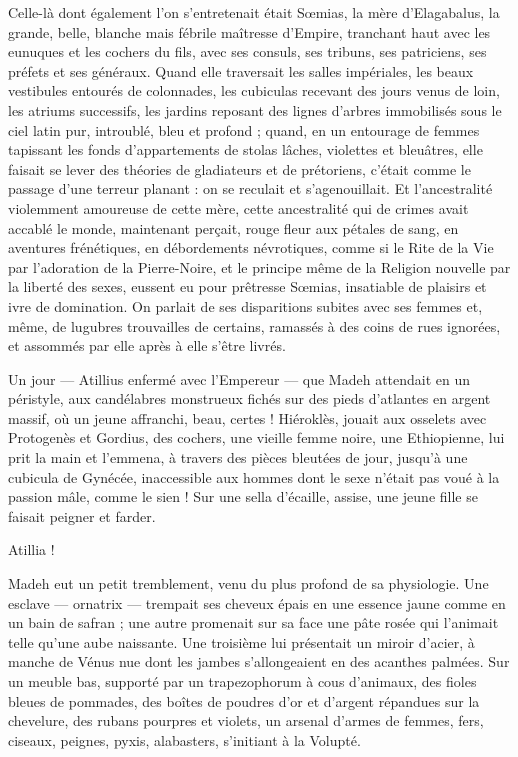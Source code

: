 \documentclass[a4paper, 11pt, oneside, polutonikogreek, french]{article}
\begin{document}
Celle-là dont également l'on s'entretenait était Sœmias, la mère d'Elagabalus, la grande, belle, blanche mais fébrile maîtresse d'Empire, tranchant haut avec les eunuques et les cochers du fils, avec ses consuls, ses tribuns, ses patriciens, ses préfets et ses généraux. Quand elle traversait les salles impériales, les beaux vestibules entourés de colonnades, les cubiculas recevant des jours venus de loin, les atriums successifs, les jardins reposant des lignes d'arbres immobilisés sous le ciel latin pur, introublé, bleu et profond ; quand, en un entourage de femmes tapissant les fonds d'appartements de stolas lâches, violettes et bleuâtres, elle faisait se lever des théories de gladiateurs et de prétoriens, c'était comme le passage d'une terreur planant : on se reculait et s'agenouillait. Et l'ancestralité violemment amoureuse de cette mère, cette ancestralité qui de crimes avait accablé le monde, maintenant perçait, rouge fleur aux pétales de sang, en aventures frénétiques, en débordements névrotiques, comme si le Rite de la Vie par l'adoration de la Pierre-Noire, et le principe même de la Religion nouvelle par la liberté des sexes, eussent eu pour prêtresse Sœmias, insatiable de plaisirs et ivre de domination. On parlait de ses disparitions subites avec ses femmes et, même, de lugubres trouvailles de certains, ramassés à des coins de rues ignorées, et assommés par elle après à elle s'être livrés.

Un jour --- Atillius enfermé avec l'Empereur --- que Madeh attendait en un péristyle, aux candélabres monstrueux fichés sur des pieds d'atlantes en argent massif, où un jeune affranchi, beau, certes ! Hiéroklès, jouait aux osselets avec Protogenès et Gordius, des cochers, une vieille femme noire, une Ethiopienne, lui prit la main et l'emmena, à travers des pièces bleutées de jour, jusqu'à une cubicula de Gynécée, inaccessible aux hommes dont le sexe n'était pas voué à la passion mâle, comme le sien ! Sur une sella d'écaille, assise, une jeune fille se faisait peigner et farder.

Atillia !

Madeh eut un petit tremblement, venu du plus profond de sa physiologie. Une esclave --- ornatrix --- trempait ses cheveux épais en une essence jaune comme en un bain de safran ; une autre promenait sur sa face une pâte rosée qui l'animait telle qu'une aube naissante. Une troisième lui présentait un miroir d'acier, à manche de Vénus nue dont les jambes s'allongeaient en des acanthes palmées. Sur un meuble bas, supporté par un trapezophorum à cous d'animaux, des fioles bleues de pommades, des boîtes de poudres d'or et d'argent répandues sur la chevelure, des rubans pourpres et violets, un arsenal d'armes de femmes, fers, ciseaux, peignes, pyxis, alabasters, s'initiant à la Volupté.
\end{document}
